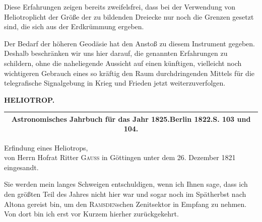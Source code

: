 \par\noindent\hspace*{\parindent}Diese Erfahrungen zeigen bereits zweifelsfrei, dass bei der Verwendung von Heliotroplicht der Größe der zu bildenden Dreiecke nur noch die Grenzen gesetzt sind, die sich aus der Erdkrümmung ergeben.

\par\noindent\hspace*{\parindent}Der Bedarf der höheren Geodäsie hat den Anstoß zu diesem Instrument gegeben. Deshalb beschränken wir uns hier darauf, die genannten Erfahrungen zu schildern, ohne die naheliegende Aussicht auf einen künftigen, vielleicht noch wichtigeren Gebrauch eines so kräftig den Raum durchdringenden Mittels für die telegrafische Signalgebung in Krieg und Frieden jetzt weiterzuverfolgen.
\par\vfill\noindent{}\par

\clearpage
\noindent{}\hfill{\small\textbf{HELIOTROP.}}\hfill\null\par\bigskip\bigskip
\begin{center}
\begin{tabular}{c}\hline
\small\textbf{Astronomisches Jahrbuch für das Jahr 1825.\quad Berlin 1822.\quad S. 103 und 104.}\\\hline
\end{tabular}\par\bigskip
{\large Erfindung eines Heliotrops,\\
von Herrn Hofrat Ritter \textsc{Gauss} in Göttingen unter dem 26. Dezember 1821\\
eingesandt.}
\end{center}
\par\noindent\hspace*{\parindent}Sie werden mein langes Schweigen entschuldigen, wenn ich Ihnen sage, dass ich den größten Teil des Jahres nicht hier war und sogar noch im Spätherbst nach Altona gereist bin, um den \textsc{Ramsden}schen Zenitsektor in Empfang zu nehmen. Von dort bin ich erst vor Kurzem hierher zurückgekehrt.

